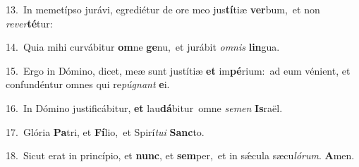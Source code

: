 {\numbfont\textcolor{\numbcolor}{13.}}~In memetípso jurávi, egrediétur de ore meo jus\-\textbf{tí}\-tiæ \textbf{ver}\-bum,~\star et non \textit{re}\-\textit{ver}\textbf{té}tur:\par
{\numbfont\textcolor{\numbcolor}{14.}}~Quia mihi curvábitur \textbf{om}\-ne \textbf{ge}\-nu,~\star et jurábit \textit{om}\-\textit{nis} \textbf{lin}\-gua.\par
{\numbfont\textcolor{\numbcolor}{15.}}~Ergo in Dómino, dicet, meæ sunt justítiæ \textbf{et} im\-\textbf{pé}\-rium:~\star ad eum vénient, et confundéntur omnes qui re\-\textit{pú}\-\textit{gnant} \textbf{e}\-i.\par
{\numbfont\textcolor{\numbcolor}{16.}}~In Dómino justificábitur, \textbf{et} lau\-\textbf{dá}\-bitur~\star omne \textit{se}\-\textit{men} \textbf{Is}\-raël.\par
{\numbfont\textcolor{\numbcolor}{17.}}~Glória \textbf{Pa}\-tri, et \textbf{Fí}\-lio,~\star et Spirí\-\textit{tu}\-\textit{i} \textbf{Sanc}\-to.\par
{\numbfont\textcolor{\numbcolor}{18.}}~Sicut erat in princípio, et \textbf{nunc}\-, et \textbf{sem}\-per,~\star et in sǽcula sæcu\-\textit{ló}\-\textit{rum}. \textbf{A}\-men.\par

